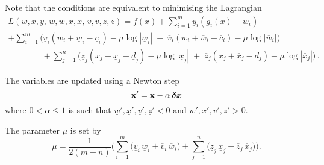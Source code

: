\documentclass[11pt,a4paper]{article}
\newcommand{\unl}[1]{{\ \!\underline{\;\!\!#1\;\!\!}\ \!}}
\renewcommand{\unl}[1]{{\underline{#1}}}
\newcommand{\ovl}[1]{{\bar{#1}}}
\renewcommand{\ovl}[1]{{\overline{#1}}}
\newcommand{\cl}{{\underline{c}}}
\newcommand{\dl}{{\underline{d}}}
\newcommand{\vl}{{\unl{v}}}
\newcommand{\wl}{{\unl{w}}}
\newcommand{\xl}{{\unl{x}}}
\newcommand{\zl}{{\unl{z}}}
\newcommand{\cu}{{\overline{c}}}
\newcommand{\du}{{\overline{d}}}
\newcommand{\vu}{{\ovl{v}}}
\newcommand{\wu}{{\ovl{w}}}
\newcommand{\xu}{{\ovl{x}}}
\newcommand{\zu}{{\ovl{z}}}
\newcommand{\w}{w}
\newcommand{\x}{x}
\newcommand{\y}{y}
\begin{document}
Note that the conditions are equivalent to minimising the Lagrangian
\begin{multline*} L(\w,\x,\y,\,\wl,\wu,\xl,\xu,\,\vl,\vu,\zl,\zu) = f(\x) + \sum_{i=1}^{m} \y_i(g_i(\x)-\w_i) \\ 
     + \sum_{i=1}^{m} \bigl(  \vl_i(\w_i+\wl_i-\cl_i)\!-\!\mu\log\!|\wl_i| \;+\; \vu_i(\w_i+\wu_i-\cu_i)\!-\!\mu\log\!|\wu_i| \bigr) \\
     \qquad\qquad + \sum_{j=1}^{n} \bigl(  \zl_j(\x_j+\xl_j-\dl_j)\!-\!\mu\log\!|\xl_j| \;+\; \zu_j(\x_j+\xu_j-\du_j)\!-\!\mu\log\!|\xu_j| \bigr) \,. \end{multline*}

The variables are updated using a Newton step
\[ \mathbf{x}' = \mathbf{x} - \alpha \, \mbox{\boldmath$\delta x$} \]
where $0<\alpha\leq 1$ is such that $\wl',\xl',\vl',\zl' < 0$ and $\wu',\xu',\vu',\zu'>0$.

The parameter $\mu$ is set by
\[  \mu = \frac{1}{2(m+n)} \biggl( \sum_{i=1}^{m}\bigl(\vl_i\,\wl_i+\vu_i\,\wu_i\bigr) + \sum_{j=1}^{n}\bigl(\zl_j\,\xl_j+\zu_j\,\xu_j\bigr) \biggr) . \]
\end{document}
